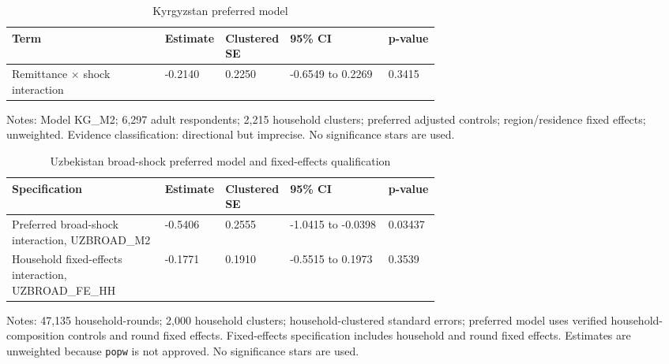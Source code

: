 \documentclass[11pt]{article}
\begin{document}
\begin{table}[!htbp]
\centering
\caption{Kyrgyzstan preferred model}
\label{tab:kgmodel}
\footnotesize
\begin{tabularx}{\linewidth}{X p{0.14\linewidth} p{0.14\linewidth} p{0.23\linewidth} p{0.12\linewidth}}
\toprule
Term & Estimate & Clustered SE & 95\% CI & p-value \\
\midrule
Remittance $\times$ shock interaction & -0.2140 & 0.2250 & -0.6549 to 0.2269 & 0.3415 \\
\bottomrule
\end{tabularx}
\begin{minipage}{0.95\linewidth}\footnotesize Notes: Model KG\_M2; 6,297 adult respondents; 2,215 household clusters; preferred adjusted controls; region/residence fixed effects; unweighted. Evidence classification: directional but imprecise. No significance stars are used.\end{minipage}
\end{table}

\begin{table}[!htbp]
\centering
\caption{Uzbekistan broad-shock preferred model and fixed-effects qualification}
\label{tab:uzmodel}
\footnotesize
\begin{tabularx}{\linewidth}{X p{0.14\linewidth} p{0.14\linewidth} p{0.23\linewidth} p{0.12\linewidth}}
\toprule
Specification & Estimate & Clustered SE & 95\% CI & p-value \\
\midrule
Preferred broad-shock interaction, UZBROAD\_M2 & -0.5406 & 0.2555 & -1.0415 to -0.0398 & 0.03437 \\
Household fixed-effects interaction, UZBROAD\_FE\_HH & -0.1771 & 0.1910 & -0.5515 to 0.1973 & 0.3539 \\
\bottomrule
\end{tabularx}
\begin{minipage}{0.95\linewidth}\footnotesize Notes: 47,135 household-rounds; 2,000 household clusters; household-clustered standard errors; preferred model uses verified household-composition controls and round fixed effects. Fixed-effects specification includes household and round fixed effects. Estimates are unweighted because \texttt{popw} is not approved. No significance stars are used.\end{minipage}
\end{table}
\end{document}
